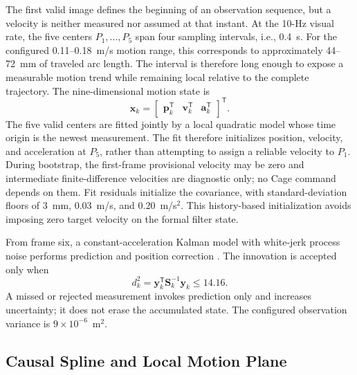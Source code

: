 \documentclass[conference]{IEEEtran}
\begin{document}
The first valid image defines the beginning of an observation sequence, but a velocity is neither measured nor assumed at that instant. At the 10-Hz visual rate, the five centers \(P_1,\ldots,P_5\) span four sampling intervals, i.e., 0.4~s. For the configured 0.11--0.18~m/s motion range, this corresponds to approximately 44--72~mm of traveled arc length. The interval is therefore long enough to expose a measurable motion trend while remaining local relative to the complete trajectory. The nine-dimensional motion state is
\begin{equation}
\mathbf x_k =
\begin{bmatrix}
\mathbf p_k^{\mathsf T}&
\mathbf v_k^{\mathsf T}&
\mathbf a_k^{\mathsf T}
\end{bmatrix}^{\mathsf T}.
\label{eq:motion_state}
\end{equation}
The five valid centers are fitted jointly by a local quadratic model whose time origin is the newest measurement. The fit therefore initializes position, velocity, and acceleration at \(P_5\), rather than attempting to assign a reliable velocity to \(P_1\). During bootstrap, the first-frame provisional velocity may be zero and intermediate finite-difference velocities are diagnostic only; no Cage command depends on them. Fit residuals initialize the covariance, with standard-deviation floors of 3~mm, 0.03~m/s, and 0.20~m/s$^2$. This history-based initialization avoids imposing zero target velocity on the formal filter state.

From frame six, a constant-acceleration Kalman model with white-jerk process noise performs prediction and position correction \cite{kalman1960}. The innovation is accepted only when
\begin{equation}
d_k^2=\mathbf y_k^{\mathsf T}\mathbf S_k^{-1}\mathbf y_k
\leq 14.16.
\label{eq:innovation_gate}
\end{equation}
A missed or rejected measurement invokes prediction only and increases uncertainty; it does not erase the accumulated state. The configured observation variance is $9\times10^{-6}$~m$^2$.

\subsection{Causal Spline and Local Motion Plane}
\end{document}
